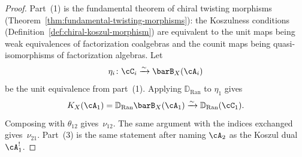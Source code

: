 \begin{proof}
Part~(1) is the fundamental theorem of chiral twisting morphisms
(Theorem~\ref{thm:fundamental-twisting-morphisms}): the Koszulness
conditions
(Definition~\ref{def:chiral-koszul-morphism}) are equivalent to
the unit maps being weak equivalences of factorization coalgebras and
the counit maps being quasi-isomorphisms of factorization algebras.
Let
\[
\eta_i \colon \cC_i \xrightarrow{\sim} \barB_X(\cA_i)
\]
be the unit equivalence from part~\textup{(1)}. Applying
$\mathbb{D}_{\operatorname{Ran}}$ to $\eta_1$ gives
\[
K_X(\cA_1)=\mathbb{D}_{\operatorname{Ran}}\barB_X(\cA_1)
\xrightarrow{\sim}
\mathbb{D}_{\operatorname{Ran}}(\cC_1).
\]
Composing with $\theta_{12}$ gives~$\nu_{12}$. The same argument with
the indices exchanged gives~$\nu_{21}$.
Part~(3) is the same statement after naming $\cA_2$ as the Koszul
dual~$\cA_1^!$.
\end{proof}

